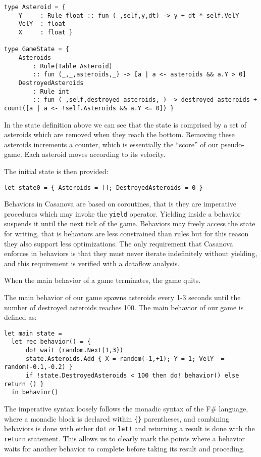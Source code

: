 \begin{lstlisting}
type Asteroid = {
    Y     : Rule float :: fun (_,self,y,dt) -> y + dt * self.VelY
    VelY  : float        
    X     : float }

type GameState = {
    Asteroids           
        : Rule(Table Asteroid)
        :: fun (_,_,asteroids,_) -> [a | a <- asteroids && a.Y > 0]  	    
    DestroyedAsteroids	
        : Rule int
        :: fun (_,self,destroyed_asteroids,_) -> destroyed_asteroids + count([a | a <- !self.Asteroids && a.Y <= 0]) }
\end{lstlisting}
  
In the state definition above we can see that the state is comprised by a set of asteroids which are removed when they reach the bottom. Removing these asteroids increments a counter, which is essentially the ``score'' of our pseudo-game. Each asteroid moves according to its velocity.

The initial state is then provided:
\begin{lstlisting}
let state0 = { Asteroids = []; DestroyedAsteroids = 0 }
\end{lstlisting}

Behaviors in Casanova are based on coroutines, that is they are imperative procedures which may invoke the \texttt{yield} operator. Yielding inside a behavior suspends it until the next tick of the game. Behaviors may freely access the state for writing, that is behaviors are less constrained than rules but for this reason they also support less optimizations. The only requirement that Casanova enforces in behaviors is that they must never iterate indefinitely without yielding, and this requirement is verified with a dataflow analysis.

When the main behavior of a game terminates, the game quits.

The main behavior of our game spawns asteroids every 1-3 seconds until the number of destroyed asteroids reaches 100. The main behavior of our game is defined as:

\begin{lstlisting}
let main state =
  let rec behavior() = {
      do! wait (random.Next(1,3))
      state.Asteroids.Add { X = random(-1,+1); Y = 1; VelY  = random(-0.1,-0.2) }
      if !state.DestroyedAsteroids < 100 then do! behavior() else return () }
  in behavior()
\end{lstlisting}
  
The imperative syntax loosely follows the monadic \cite{MOGGI_MON,COMPR_MON} syntax of the F\# language, where a monadic block is declared within \texttt{\{\}} parentheses, and combining behaviors is done with either \texttt{do!} or \texttt{let!} and returning a result is done with the \texttt{return} statement. This allows us to clearly mark the points where a behavior waits for another behavior to complete before taking its result and proceding.


